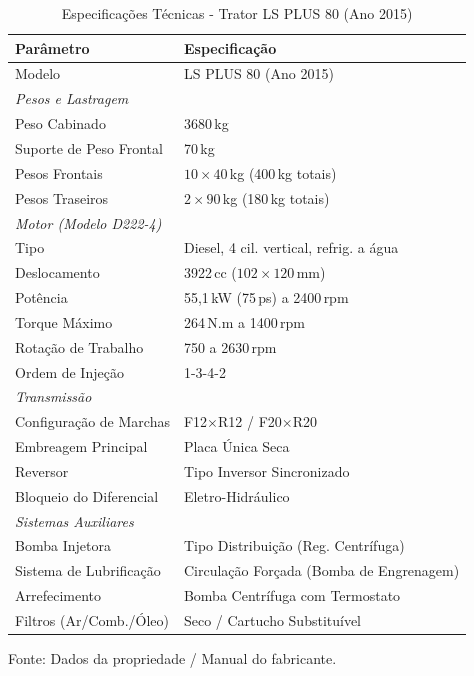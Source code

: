\documentclass[12pt,openright,oneside,a4paper,hidelinks,espacamento=1.5]{abntex2}
\begin{document}
\begin{table}[H]
    \centering
    \caption{Especificações Técnicas - Trator LS PLUS 80 (Ano 2015)}
    \label{tab:trator-ls80}
    \vspace{0.1cm}
    \begin{tabular}{ll}
        \toprule
        \textbf{Parâmetro} & \textbf{Especificação} \\
        \midrule
        Modelo & LS PLUS 80 (Ano 2015) \\
        \midrule
        \textit{Pesos e Lastragem} & \\
        Peso Cabinado & 3680\,kg \\
        Suporte de Peso Frontal & 70\,kg \\
        Pesos Frontais & $10 \times 40$\,kg (400\,kg totais) \\
        Pesos Traseiros & $2 \times 90$\,kg (180\,kg totais) \\
        \midrule
        \textit{Motor (Modelo D222-4)} & \\
        Tipo & Diesel, 4 cil. vertical, refrig. a água \\
        Deslocamento & 3922\,cc ($102 \times 120$\,mm) \\
        Potência & 55,1\,kW (75\,ps) a 2400\,rpm \\
        Torque Máximo & 264\,N.m a 1400\,rpm \\
        Rotação de Trabalho & 750 a 2630\,rpm \\
        Ordem de Injeção & 1-3-4-2 \\
        \midrule
        \textit{Transmissão} & \\
        Configuração de Marchas & F12$\times$R12 / F20$\times$R20 \\
        Embreagem Principal & Placa Única Seca \\
        Reversor & Tipo Inversor Sincronizado \\
        Bloqueio do Diferencial & Eletro-Hidráulico \\
        \midrule
        \textit{Sistemas Auxiliares} & \\
        Bomba Injetora & Tipo Distribuição (Reg. Centrífuga) \\
        Sistema de Lubrificação & Circulação Forçada (Bomba de Engrenagem) \\
        Arrefecimento & Bomba Centrífuga com Termostato \\
        Filtros (Ar/Comb./Óleo) & Seco / Cartucho Substituível \\
        \bottomrule
    \end{tabular}
    \vspace{0.1cm}
    \begin{footnotesize}
        \begin{flushleft}
            Fonte: Dados da propriedade / Manual do fabricante.
        \end{flushleft}
    \end{footnotesize}
\end{table}
\end{document}
